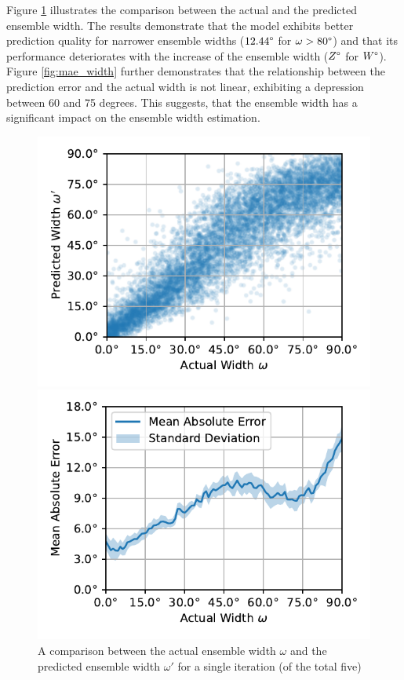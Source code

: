 \documentclass{article}
\begin{document}
Figure \ref{fig:actual_vs_predicted_width} illustrates the comparison between the actual and the predicted ensemble width. The results demonstrate that the model exhibits better prediction quality for narrower ensemble widths ($12.44\degree$ for $\omega>80\degree$) and that its performance deteriorates with the increase of the ensemble width ($Z\degree$ for $W\degree$). Figure \ref{fig:mae_width} further demonstrates that the relationship between the prediction error and the actual width is not linear, exhibiting a depression between 60 and 75 degrees. This suggests, that the ensemble width has a significant impact on the ensemble width estimation.

\begin{figure}[ht]
  \centering
  \begin{minipage}[t]{0.45\linewidth}
    \includegraphics[width=\linewidth]{../figures/actual_vs_predicted_width.pdf}
    \caption{\label{fig:actual_vs_predicted_width}A comparison between the actual ensemble width $\omega$ and the predicted ensemble width $\omega'$ for a single iteration (of the total five) }
  \end{minipage}
  \hspace{0.5cm}
  \begin{minipage}[t]{0.45\linewidth}
    \includegraphics[width=\linewidth]{../figures/mae_width.pdf}

\end{minipage}
\end{figure}
\end{document}
